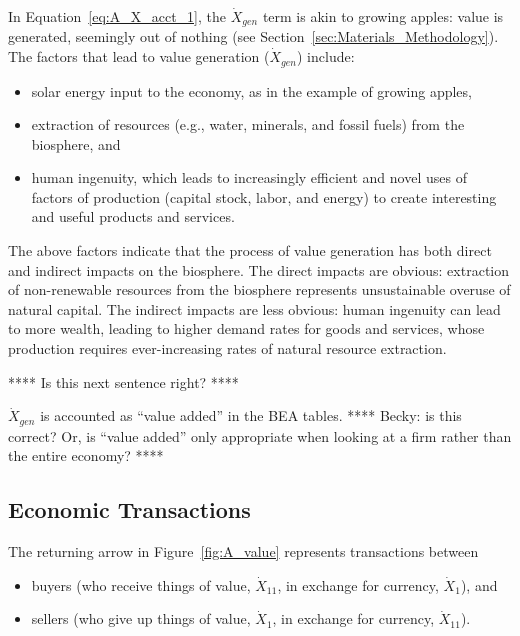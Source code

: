 \noindent In Equation~\ref{eq:A_X_acct_1}, 
the $\dot{X}_{gen}$ term is akin to growing apples: 
value is generated, seemingly out of nothing
(see Section~\ref{sec:Materials_Methodology}).
The factors that lead to value generation 
($\dot{X}_{gen}$) include:

\begin{itemize}
	\item{solar energy 
	input to the economy,
	as in the example of growing apples,}
	\item{extraction of resources (e.g., water, minerals, 
	and fossil fuels) from the biosphere, and}
	\item{human ingenuity, which leads to
	increasingly efficient and novel uses of factors of production
	(capital stock, labor, and energy)
	to create interesting and useful products and services.}
\end{itemize}

The above factors indicate that the process of value generation
has both direct and indirect impacts on the biosphere.
The direct impacts are obvious: 
extraction of non-renewable resources from the biosphere 
represents unsustainable overuse of natural capital.
The indirect impacts are less obvious: 
human ingenuity can lead to more wealth,
leading to higher demand rates for goods and services, 
whose production requires ever-increasing rates of natural resource extraction.

**** Is this next sentence right? ****

$\dot{X}_{gen}$ is accounted as ``value added'' in the BEA tables.
**** Becky: is this correct? Or, is ``value added'' only appropriate when 
looking at a firm rather than the entire economy? ****



\subsection{Economic Transactions}

The returning arrow in Figure~\ref{fig:A_value} 
represents transactions between 
\begin{itemize}
	\item{buyers (who receive things of value, $\dot{X}_{11}$,
	in exchange for currency, $\dot{X}_{1}$), and}
	\item{sellers (who give up things of value, $\dot{X}_{1}$,
	in exchange for currency, $\dot{X}_{11}$).}
\end{itemize}

